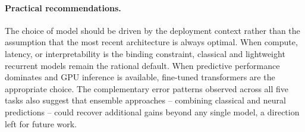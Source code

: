 \documentclass[11pt,a4paper]{article}
\begin{document}
\paragraph{Practical recommendations.}
The choice of model should be driven by the deployment context rather than
the assumption that the most recent architecture is always optimal. When
compute, latency, or interpretability is the binding constraint, classical
and lightweight recurrent models remain the rational default. When predictive
performance dominates and GPU inference is available, fine-tuned transformers
are the appropriate choice. The complementary error patterns observed across
all five tasks also suggest that ensemble approaches -- combining classical
and neural predictions -- could recover additional gains beyond any single
model, a direction left for future work.
\end{document}
